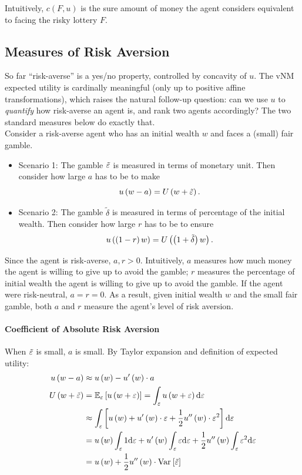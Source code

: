 Intuitively, \(c(F,u)\) is the sure amount of money the agent considers
equivalent to facing the risky lottery \(F\).


\subsection{Measures of Risk Aversion}\label{measure-of-risk}

So far ``risk-averse'' is a yes/no property, controlled by concavity of
\(u\). The vNM expected utility is cardinally meaningful (only up to
positive affine transformations), which raises the natural follow-up
question: can we use \(u\) to \emph{quantify} how risk-averse an agent
is, and rank two agents accordingly? The two standard measures below
do exactly that.\\

\noindent Consider a risk-averse agent who has an initial wealth \(w\) and faces a
(small) fair gamble.

\begin{itemize}
\item
  Scenario 1: The gamble \(\tilde\ve\) is measured in terms of monetary unit.
  Then consider how large $a$ has to be to make
  \[u\pr{w-a} = U\pr{w+\tilde \ve}.\]
\item
  Scenario 2: The gamble \(\tilde\delta\) is measured in terms of  percentage of
  the initial wealth. Then consider how large $r$ has to be to ensure
  \[u\pr{\pr{1-r}w} = U\pr{\pr{1+\tilde\delta}w}.\]
\end{itemize}

Since the agent is risk-averse, \(a,r>0\). Intuitively, \(a\) measures
how much money the agent is willing to give up to avoid the gamble;
\(r\) measures the percentage of initial wealth the agent is willing to
give up to avoid the gamble. If the agent were risk-neutral,
\(a = r= 0\). As a result, given initial wealth \(w\) and the small fair gamble, both \(a\) and \(r\)
measure the agent's level of risk aversion.

\paragraph{Coefficient of Absolute Risk Aversion}

When \(\tilde\ve\) is small, \(a\) is small. By Taylor expansion and definition of expected utility:
\[\ba
u\pr{w-a}&\approx u\pr{w}-u'\pr{w}\cdot a\\
U\pr{w+\tilde\ve} & = \E[\ve]{u\pr{w+\ve}} = \int_{\ve}u\pr{w+\ve}\text d\ve\\
& \approx \int_{\ve} \br{u\pr{w}+u'\pr{w}\cdot\ve+\frac12 u''\pr{w}\cdot\ve^2} \text d\ve\\
& = u\pr{w} \int_{\ve} 1 \text d\ve + u'\pr{w} \int_{\ve} \ve \text d\ve +\frac12  u''\pr{w}\int_{\ve} \ve^2 \text d\ve\\
& = u\pr{w} + \frac12 u''\pr{w}\cdot \var{\tilde\ve}
\ea\]

